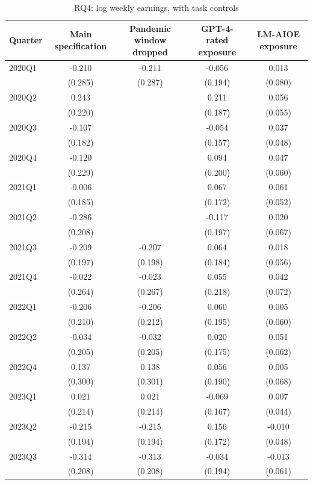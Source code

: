 \begin{table}[htbp]\centering
\caption{RQ4: log weekly earnings, with task controls}
\begin{tabular}{lcccc}
\toprule
Quarter & Main specification & Pandemic window dropped & GPT-4-rated exposure & LM-AIOE exposure \\
\midrule
2020Q1 & -0.210 & -0.211 & -0.056 & 0.013 \\
 & (0.285) & (0.287) & (0.194) & (0.080) \\
2020Q2 & 0.243 &  & 0.211 & 0.056 \\
 & (0.220) &  & (0.187) & (0.055) \\
2020Q3 & -0.107 &  & -0.054 & 0.037 \\
 & (0.182) &  & (0.157) & (0.048) \\
2020Q4 & -0.120 &  & 0.094 & 0.047 \\
 & (0.229) &  & (0.200) & (0.060) \\
2021Q1 & -0.006 &  & 0.067 & 0.061 \\
 & (0.185) &  & (0.172) & (0.052) \\
2021Q2 & -0.286 &  & -0.117 & 0.020 \\
 & (0.208) &  & (0.197) & (0.067) \\
2021Q3 & -0.209 & -0.207 & 0.064 & 0.018 \\
 & (0.197) & (0.198) & (0.184) & (0.056) \\
2021Q4 & -0.022 & -0.023 & 0.055 & 0.042 \\
 & (0.264) & (0.267) & (0.218) & (0.072) \\
2022Q1 & -0.206 & -0.206 & 0.060 & 0.005 \\
 & (0.210) & (0.212) & (0.195) & (0.060) \\
2022Q2 & -0.034 & -0.032 & 0.020 & 0.051 \\
 & (0.205) & (0.205) & (0.175) & (0.062) \\
2022Q4 & 0.137 & 0.138 & 0.056 & 0.005 \\
 & (0.300) & (0.301) & (0.190) & (0.068) \\
2023Q1 & 0.021 & 0.021 & -0.069 & 0.007 \\
 & (0.214) & (0.214) & (0.167) & (0.044) \\
2023Q2 & -0.215 & -0.215 & 0.156 & -0.010 \\
 & (0.194) & (0.194) & (0.172) & (0.048) \\
2023Q3 & -0.314 & -0.313 & -0.034 & -0.013 \\
 & (0.208) & (0.208) & (0.194) & (0.061) \\

\end{tabular}
\end{table}
